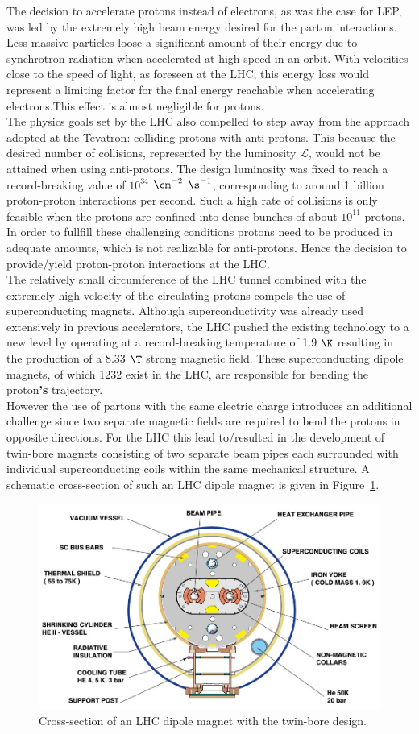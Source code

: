 The decision to accelerate protons instead of electrons, as was the case for LEP, was led by the extremely high beam energy desired for the parton interactions. Less massive particles loose a significant amount of their energy due to synchrotron radiation when accelerated at high speed in an orbit. With velocities close to the speed of light, as foreseen at the LHC, this energy loss would represent a limiting factor for the final energy reachable when accelerating electrons.This effect is almost negligible for protons.
\\
The physics goals set by the LHC also compelled to step away from the approach adopted at the Tevatron: colliding protons with anti-protons. This because the desired number of collisions, represented by the luminosity $\mathcal{L}$, would not be attained when using anti-protons. The design luminosity was fixed to reach a record-breaking value of $10^{34}$ $\cm^{-2}$ $\s^{-1}$, corresponding to around 1 billion proton-proton interactions per second. Such a high rate of collisions is only feasible when the protons are confined into dense bunches of about $10^{11}$ protons.
In order to fullfill these challenging conditions protons need to be produced in adequate amounts, which is not realizable for anti-protons. 
Hence the decision to provide/yield proton-proton interactions at the LHC.
\\
The relatively small circumference of the LHC tunnel combined with the extremely high velocity of the circulating protons compels the use of superconducting magnets. Although superconductivity was already used extensively in previous accelerators, the LHC pushed the existing technology to a new level by operating at a record-breaking temperature of 1.9 $\K$ resulting in the production of a 8.33 $\T$ strong magnetic field. 
These superconducting dipole magnets, of which 1232 exist in the LHC, are responsible for bending the proton\textbf{'s} trajectory.
\\
However the use of partons with the same electric charge introduces an additional challenge since two separate magnetic fields are required to bend the protons in opposite directions. For the LHC this lead to/resulted in the development of twin-bore magnets consisting of two separate beam pipes each surrounded with individual superconducting coils within the same mechanical structure.
A schematic cross-section of such an LHC dipole magnet is given in Figure~\ref{fig::LHCDipole}.
\begin{figure}[h!t]
 \centering
 \includegraphics[width = 0.6 \textwidth]{Chapters/Chapter2_CERN/Figures/lhc-pho-1998-341.jpg}
 \caption{Cross-section of an LHC dipole magnet with the twin-bore design.}%
 \label{fig::LHCDipole}
\end{figure}

